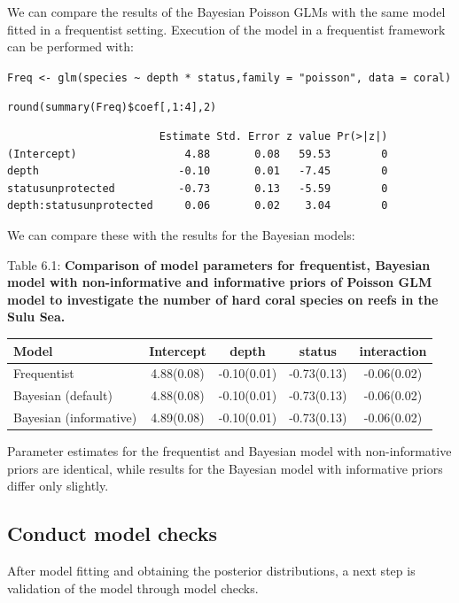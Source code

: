 \documentclass[
]{book}
\begin{document}
We can compare the results of the Bayesian Poisson GLMs with the same model fitted in a frequentist setting. Execution of the model in a frequentist framework can be performed with:

\texttt{Freq\ \textless{}-\ glm(species\ \textasciitilde{}\ depth\ *\ status,family\ =\ "poisson",\ data\ =\ coral)}

\texttt{round(summary(Freq)\$coef{[},1:4{]},2)}

\begin{verbatim}
                        Estimate Std. Error z value Pr(>|z|)
(Intercept)                 4.88       0.08   59.53        0
depth                      -0.10       0.01   -7.45        0
statusunprotected          -0.73       0.13   -5.59        0
depth:statusunprotected     0.06       0.02    3.04        0
\end{verbatim}

We can compare these with the results for the Bayesian models:

Table 6.1: \textbf{Comparison of model parameters for frequentist, Bayesian model with non-informative and informative priors of Poisson GLM model to investigate the number of hard coral species on reefs in the Sulu Sea.}

\begin{longtable}[]{@{}lcccc@{}}
\toprule
Model & Intercept & depth & status & interaction \\
\midrule
\endhead
Frequentist & 4.88(0.08) & -0.10(0.01) & -0.73(0.13) & -0.06(0.02) \\
Bayesian (default) & 4.88(0.08) & -0.10(0.01) & -0.73(0.13) & -0.06(0.02) \\
Bayesian (informative) & 4.89(0.08) & -0.10(0.01) & -0.73(0.13) & -0.06(0.02) \\
\bottomrule
\end{longtable}

Parameter estimates for the frequentist and Bayesian model with non-informative priors are identical, while results for the Bayesian model with informative priors differ only slightly.

\hypertarget{conduct-model-checks-2}{%
\subsection{Conduct model checks}\label{conduct-model-checks-2}}

After model fitting and obtaining the posterior distributions, a next step is validation of the model through model checks.
\end{document}
